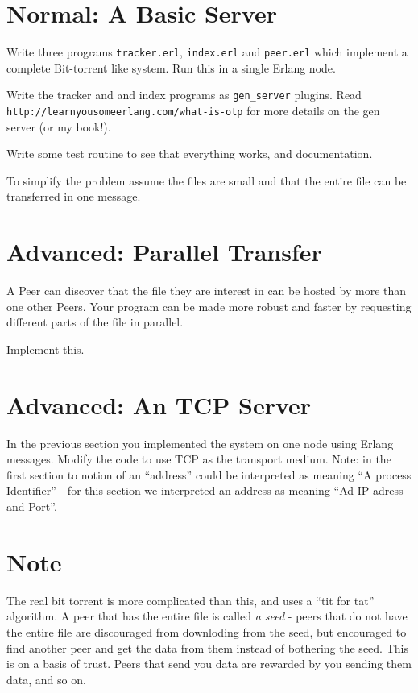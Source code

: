 \documentclass[12pt]{hitec}
\begin{document}
\section{Normal: A Basic Server}

Write three programs \verb+tracker.erl+, \verb+index.erl+ and \verb+peer.erl+
which implement a complete Bit-torrent like system. Run this in a single Erlang node.

Write the tracker and and index programs as \verb+gen_server+ plugins.
Read \verb+http://learnyousomeerlang.com/what-is-otp+ for more details
on the gen server (or my book!).

Write some test routine to see that everything works, and documentation.

To simplify the problem assume the files are small and that the entire file
can be transferred in one message.

\section{Advanced: Parallel Transfer}

A Peer can discover that the file they are interest in can be hosted
by more than one other Peers. Your program can be made more robust and
faster by requesting different parts of the file in parallel.

Implement this.

\section{Advanced: An TCP Server}

In the previous section you implemented the system on one node using
Erlang messages.  Modify the code to use TCP as the transport
medium. Note: in the first section to notion of an ``address'' could
be interpreted as meaning ``A process Identifier'' - for this section
we interpreted an address as meaning ``Ad IP adress and Port''.


\section*{Note}

The real bit torrent is more complicated than this, and uses a ``tit
for tat'' algorithm.  A peer that has the entire file is called {\sl a
  seed} - peers that do not have the entire file are discouraged from
downloding from the seed, but encouraged to find another peer and get
the data from them instead of bothering the seed. This is on a basis
of trust. Peers that send you data are rewarded by you sending them
data, and so on.
\end{document}
